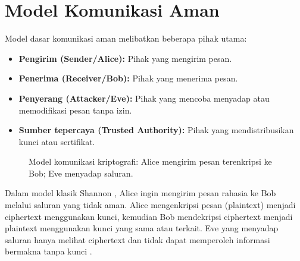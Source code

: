 \section{Model Komunikasi Aman}

Model dasar komunikasi aman melibatkan beberapa pihak utama:

\begin{itemize}
\item \textbf{Pengirim (Sender/Alice):} Pihak yang mengirim pesan.
\item \textbf{Penerima (Receiver/Bob):} Pihak yang menerima pesan.
\item \textbf{Penyerang (Attacker/Eve):} Pihak yang mencoba menyadap atau memodifikasi pesan tanpa izin.
\item \textbf{Sumber tepercaya (Trusted Authority):} Pihak yang mendistribusikan kunci atau sertifikat.
\end{itemize}

\begin{figure}[!htbp]
\centering
{}
\caption{Model komunikasi kriptografi: Alice mengirim pesan terenkripsi ke Bob; Eve menyadap saluran.}
\label{fig:model-komunikasi}
\end{figure}

Dalam model klasik Shannon \cite{shannon1949}, Alice ingin mengirim pesan rahasia ke Bob melalui saluran yang tidak aman. Alice mengenkripsi pesan (plaintext) menjadi ciphertext menggunakan kunci, kemudian Bob mendekripsi ciphertext menjadi plaintext menggunakan kunci yang sama atau terkait. Eve yang menyadap saluran hanya melihat ciphertext dan tidak dapat memperoleh informasi bermakna tanpa kunci \cite{stinson2018}.
